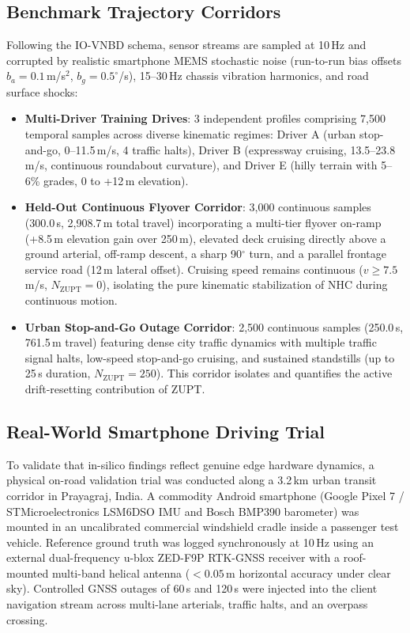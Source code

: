 \documentclass[conference]{IEEEtran}
\begin{document}
\subsection{Benchmark Trajectory Corridors}
Following the IO-VNBD schema, sensor streams are sampled at 10\,Hz and corrupted by realistic smartphone MEMS stochastic noise (run-to-run bias offsets $b_a = 0.1$\,m/s$^2$, $b_g = 0.5^\circ$/s), 15--30\,Hz chassis vibration harmonics, and road surface shocks:
\begin{itemize}
\item \textbf{Multi-Driver Training Drives}: 3 independent profiles comprising 7,500 temporal samples across diverse kinematic regimes: Driver A (urban stop-and-go, 0--11.5\,m/s, 4 traffic halts), Driver B (expressway cruising, 13.5--23.8\,m/s, continuous roundabout curvature), and Driver E (hilly terrain with 5--6\% grades, 0 to +12\,m elevation).
\item \textbf{Held-Out Continuous Flyover Corridor}: 3,000 continuous samples (300.0\,s, 2{,}908.7\,m total travel) incorporating a multi-tier flyover on-ramp (+8.5\,m elevation gain over 250\,m), elevated deck cruising directly above a ground arterial, off-ramp descent, a sharp 90$^\circ$ turn, and a parallel frontage service road (12\,m lateral offset). Cruising speed remains continuous ($v \ge 7.5$\,m/s, $N_{\text{ZUPT}}=0$), isolating the pure kinematic stabilization of NHC during continuous motion.
\item \textbf{Urban Stop-and-Go Outage Corridor}: 2,500 continuous samples (250.0\,s, 761.5\,m travel) featuring dense city traffic dynamics with multiple traffic signal halts, low-speed stop-and-go cruising, and sustained standstills (up to 25\,s duration, $N_{\text{ZUPT}}=250$). This corridor isolates and quantifies the active drift-resetting contribution of ZUPT.
\end{itemize}

\subsection{Real-World Smartphone Driving Trial}
To validate that in-silico findings reflect genuine edge hardware dynamics, a physical on-road validation trial was conducted along a 3.2\,km urban transit corridor in Prayagraj, India. A commodity Android smartphone (Google Pixel 7 / STMicroelectronics LSM6DSO IMU and Bosch BMP390 barometer) was mounted in an uncalibrated commercial windshield cradle inside a passenger test vehicle. Reference ground truth was logged synchronously at 10\,Hz using an external dual-frequency u-blox ZED-F9P RTK-GNSS receiver with a roof-mounted multi-band helical antenna ($<0.05$\,m horizontal accuracy under clear sky). Controlled GNSS outages of 60\,s and 120\,s were injected into the client navigation stream across multi-lane arterials, traffic halts, and an overpass crossing.
\end{document}
